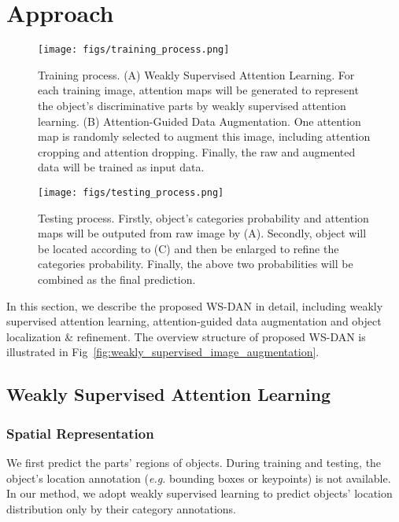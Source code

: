 \documentclass[10pt,twocolumn,letterpaper]{article}
\def\eg{{\em e.g. }}
\begin{document}
\section{Approach}
\label{sec:approach}
\begin{figure*}[t]
    \centering
    \begin{subfigure}{0.60\textwidth}
        \centering
        \texttt{[image: figs/training\_process.png]}
        \caption{Training process. (A) Weakly Supervised Attention Learning. For each training image, attention maps will be generated to represent the object's discriminative parts by weakly supervised attention learning. (B) Attention-Guided Data Augmentation. One attention map is randomly selected to augment this image, including attention cropping and attention dropping. Finally, the raw and augmented data will be trained as input data.}
        \label{fig:training_process}
    \end{subfigure}

    \begin{subfigure}{0.60\textwidth}
        \centering
        \texttt{[image: figs/testing\_process.png]}
        \caption{Testing process. Firstly, object's categories probability and attention maps will be outputed from raw image by (A). Secondly, object will be located according to (C) and then be enlarged to refine the categories probability. Finally, the above two probabilities will be combined as the final prediction.}
        \label{fig:testing_process}
    \end{subfigure}
    \caption{Overview training and testing process of Weakly Supservised Data Augmentation Network.}
    \label{fig:weakly_supervised_image_augmentation}
\end{figure*}

In this section, we describe the proposed WS-DAN in detail, including weakly supervised attention learning, attention-guided data augmentation and object localization \& refinement. The overview structure of proposed WS-DAN is illustrated in Fig~\ref{fig:weakly_supervised_image_augmentation}.

\subsection{Weakly Supervised Attention Learning}
\subsubsection{Spatial Representation}
We first predict the parts' regions of objects. During training and testing, the object's location annotation (\eg bounding boxes or keypoints) is not available. In our method, we adopt weakly supervised learning to predict objects' location distribution only by their category annotations.
\end{document}
